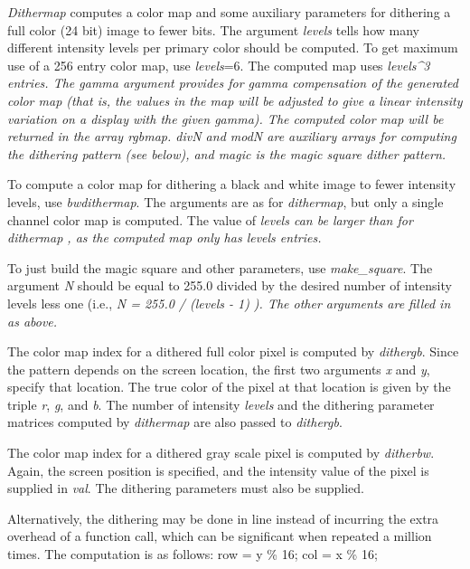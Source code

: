 {\it Dithermap}
computes a color map and some auxiliary parameters for dithering a
full color (24 bit) image to fewer bits.  The argument
{\it levels}
tells how many different intensity levels per primary color should be
computed.  To get maximum use of a 256 entry color map, use
{\it levels}{\rm =6.}
The computed map uses %
\it levels\^{}3 \rm%
entries.
The
{\it gamma} 
argument provides for gamma compensation of the generated color map
(that is, the values in the map will be adjusted to give a linear
intensity variation on a display with the given gamma).
The computed color map will be returned in the array
{\it rgbmap}{\rm .}
{\it divN}
and
{\it modN}
are auxiliary arrays for computing the dithering pattern (see below),
and
{\it magic}
is the magic square dither pattern.
\par
To compute a color map for dithering a black and white image to fewer
intensity levels, use
{\it bwdithermap}{\rm .}
The arguments are as for
{\it dithermap}{\rm ,}
but only a single channel color map is computed.  The value of
%
\it levels \rm%
can be larger than for %
\it dithermap\rm%
, as
the computed map only has %
\it levels \rm%
entries.
\par
To just build the magic square and other parameters, use
{\it make\_square}{\rm .}
The argument
{\it N}
should be equal to 255.0 divided by the desired number of intensity
levels less one (i.e., %
\it N = 255.0 / (levels - 1)\rm%
).  The other
arguments are filled in as above.
\par
The color map index for a dithered full color pixel is computed by
{\it dithergb}{\rm .}
Since the pattern depends on the screen location, the first two
arguments
{\it x}
and
{\it y}{\rm ,}
specify that location.  The true color of the pixel at that location
is given by the triple
{\it r}{\rm ,}
{\it g}{\rm ,}
and
{\it b}{\rm .}
The number of intensity
{\it levels}
and the dithering parameter matrices computed by
{\it dithermap}
are also passed to 
{\it dithergb}{\rm .}
\par
The color map index for a dithered gray scale pixel is computed by
{\it ditherbw}{\rm .}
Again, the screen position is specified, and the intensity value of
the pixel is supplied in
{\it val}{\rm .}
The dithering parameters must also be supplied.
\par
Alternatively, the dithering may be done in line instead of incurring
the extra overhead of a function call, which can be significant when
repeated a million times.  The computation is as follows:
\nofill
		row = y \% 16;
		col = x \% 16;
